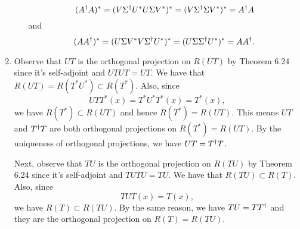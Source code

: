 \begin{enumerate}
\begin{enumerate}
\[(A^{\dagger} A)^*=(V\Sigma^{\dagger} U^*U\Sigma V^*)^*=(V\Sigma^{\dagger} \Sigma V^*)^*=A^{\dagger} A\]
and 
\[(AA^{\dagger})^*=(U\Sigma V^*V\Sigma ^{\dagger} U^*)^*=(U\Sigma \Sigma^{\dagger} U^*)^*=AA^{\dagger} .\]
\end{enumerate}
\item Observe that $UT$ is the orthogonal projection on $R(UT)$ by Theorem 6.24 since it's self-adjoint and $UTUT=UT$. We have that $R(UT)=R(T^*U^*)\subset R(T^*)$. Also, since 
\[UTT^*(x)=T^*U^*T^*(x)=T^*(x),\]
we have $R(T^*)\subset R(UT)$ and hence $R(T^*)=R(UT)$. This means $UT$ and $T^{\dagger} T$ are both orthogonal projections on $R(T^*)=R(UT)$. By the uniqueness of orthogonal projections, we have $UT=T^{\dagger} T$. 

Next, observe that $TU$ is the orthogonal projection on $R(TU)$ by Theorem 6.24 since it's self-adjoint and $TUTU=TU$. We have that $R(TU)\subset R(T)$. Also, since 
\[TUT(x)=T(x),\]
we have $R(T)\subset R(TU)$. By the same reason, we have $TU=TT^{\dagger} $ and they are the orthogonal projection on $R(T)=R(TU)$.


\end{enumerate}
